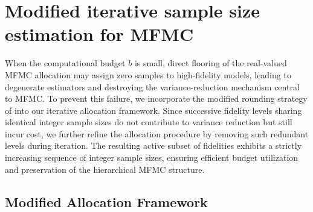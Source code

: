 \section{Modified iterative sample size estimation for MFMC}\label{sec:Modified_IntegerValued_Sample_Size}
When the computational budget $b$ is small, direct flooring of the real-valued MFMC allocation may assign zero samples to high-fidelity models, leading to degenerate estimators and destroying the variance-reduction mechanism central to MFMC. To prevent this failure, we incorporate the modified rounding strategy of \cite{GrGuJuWa:2023} into our iterative allocation framework. Since successive fidelity levels sharing identical integer sample sizes do not contribute to variance reduction but still incur cost, we further refine the allocation procedure by removing such redundant levels during iteration. The resulting active subset of fidelities exhibits a strictly increasing sequence of integer sample sizes, ensuring efficient budget utilization and preservation of the hierarchical MFMC structure.







\subsection{Modified Allocation Framework}

